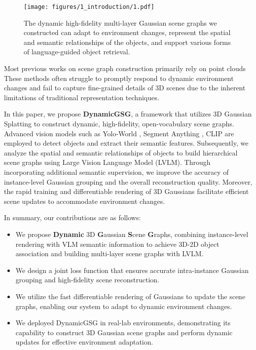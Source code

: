 \begin{figure}
  \centering
  \texttt{[image: figures/1\_introduction/1.pdf]}
  \caption{The dynamic high-fidelity multi-layer Gaussian scene graphs we constructed can adapt to environment changes, represent the spatial and semantic relationships of the objects, and support various forms of language-guided object retrieval.}
  \label{fig:teaser}
\end{figure}

Most previous works on scene graph construction primarily rely on point clouds~\cite{gu2023conceptgraphsopenvocabulary3dscene, werby23hovsg, linok2024barequeriesopenvocabularyobject, hughes2022hydra, hughes2024foundations} These methods often struggle to promptly respond to dynamic environment changes and fail to capture fine-grained details of 3D scenes due to the inherent limitations of traditional representation techniques. 

In this paper, we propose \textbf{DynamicGSG}, a framework that utilizes 3D Gaussian Splatting to construct dynamic, high-fidelity, open-vocabulary scene graphs. Advanced vision models such as Yolo-World \cite{cheng2024yoloworldrealtimeopenvocabularyobject}, Segment Anything \cite{kirillov2023segment}, CLIP \cite{radford2021learningtransferablevisualmodels} are employed to detect objects and extract their semantic features. Subsequently, we analyze the spatial and semantic relationships of objects to build hierarchical scene graphs using Large Vision Language Model (LVLM). Through incorporating additional semantic supervision, we improve the accuracy of instance-level Gaussian grouping and the overall reconstruction quality. Moreover, the rapid training and differentiable rendering of 3D Gaussians facilitate efficient scene updates to accommodate environment changes.  

In summary, our contributions are as follows:
\begin{itemize}
    \item We propose \textbf{Dynamic} 3D \textbf{G}aussian \textbf{S}cene \textbf{G}raphs, combining instance-level rendering with VLM semantic information to achieve 3D-2D object association and building multi-layer scene graphs with LVLM.
    \item We design a joint loss function that ensures accurate intra-instance Gaussian grouping and high-fidelity scene reconstruction.
    \item We utilize the fast differentiable rendering of Gaussians to update the scene graphs, enabling our system to adapt to dynamic environment changes.
    \item We deployed DynamicGSG in real-lab environments, demonstrating its capability to construct 3D Gaussian scene graphs and perform dynamic updates for effective environment adaptation.
\end{itemize}

